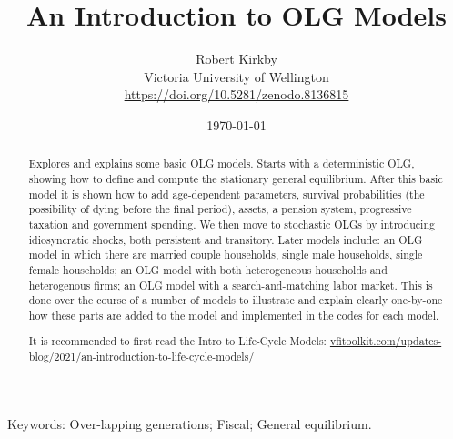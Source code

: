 \documentclass[11pt]{article}%
\begin{document}
\title{An Introduction to OLG Models}
\author{Robert Kirkby \\ Victoria University of Wellington
\\ \href{https://doi.org/10.5281/zenodo.8136815}{https://doi.org/10.5281/zenodo.8136815}
}
\date{\today \\ }
\maketitle

\vspace{-10mm}
\begin{abstract}
Explores and explains some basic OLG models. Starts with a deterministic OLG, showing how to define and compute the stationary general equilibrium. After this basic model it is shown how to add age-dependent parameters, survival probabilities (the possibility of dying before the final period), assets, a pension system, progressive taxation and government spending. We then move to stochastic OLGs by introducing idiosyncratic shocks, both persistent and transitory. Later models include: an OLG model in which there are married couple households, single male households, single female households; an OLG model with both heterogeneous households and heterogenous firms; an OLG model with a search-and-matching labor market. This is done over the course of a number of models to illustrate and explain clearly one-by-one how these parts are added to the model and implemented in the codes for each model.

It is recommended to first read the Intro to Life-Cycle Models: \href{https://www.vfitoolkit.com/updates-blog/2021/an-introduction-to-life-cycle-models/}{vfitoolkit.com/updates-blog/2021/an-introduction-to-life-cycle-models/}
\end{abstract}

Keywords: Over-lapping generations; Fiscal; General equilibrium. \\
\small

\thispagestyle{empty}

\newpage

\tableofcontents

\newpage

\newpage
\end{document}
